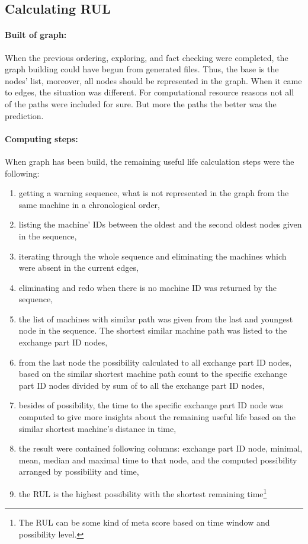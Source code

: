 	\subsection{Calculating RUL}
			\paragraph{Built of graph:}
			When the previous ordering, exploring, and fact checking were completed, the graph building could have begun from generated files. Thus, the base is the nodes' list, moreover, all nodes should be represented in the graph. When it came to edges, the situation was different. For computational resource reasons not all of the paths were included for sure. But more the paths the better was the prediction.
			\paragraph{Computing steps:}
			When graph has been build, the remaining useful life calculation steps were the following:
			\begin{enumerate}
				\item{getting a warning sequence, what is not represented in the graph from the same machine in a chronological order,}
				\item{listing the machine' IDs between the oldest and the second oldest nodes given in the sequence,}
				\item{iterating through the whole sequence and eliminating the machines which were absent in the current edges,}
				\item{eliminating and redo when there is no machine ID was returned by the sequence,}
				\item{the list of machines with similar path was given from the last and youngest node in the sequence. The shortest similar machine path was listed to the exchange part ID nodes,}
				\item{from the last node the possibility calculated to all exchange part ID nodes, based on the similar shortest machine path count to the specific exchange part ID nodes divided by sum of to all the exchange part ID nodes,}
				\item{besides of possibility, the time to the specific exchange part ID node was computed to give more insights about the remaining useful life based on the similar shortest machine's distance in time,}
				\item{the result were contained following columns: exchange part ID node, minimal, mean, median and maximal time to that node, and the computed possibility arranged by possibility and time,} 
		 		\item{the RUL is the highest possibility with the shortest remaining time\footnote{The RUL can be some kind of meta score based on time window and possibility level.}}
		 	\end{enumerate}
